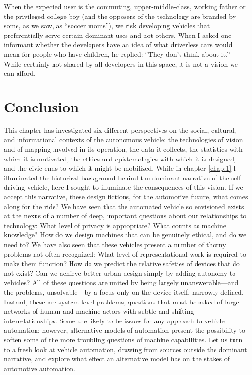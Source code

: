 When the
expected user is the commuting, upper-middle-class, working father or
the privileged college boy (and the opposers of the technology are
branded by some, as we saw, as ``soccer moms''), we risk developing
vehicles that preferentially serve certain dominant uses and not
others. When I asked one informant whether the developers have an idea
of what driverless cars would mean for people who have children, he
replied:  ``They don't think about it.'' While certainly not shared by
all developers in this space, it is not a vision we can afford.

\section{Conclusion}

This chapter has investigated six different perspectives on the
social, cultural, and informational contexts of the autonomous
vehicle:  the technologies of vision and of mapping involved
in its operation, the 
data it collects, the statistics with which it is motivated, the
ethics and epistemologies with which it is designed, and the civic
ends to which it might be mobilized. While in chapter \ref{chap:1} I
illuminated the historical background behind the dominant narrative of
the self-driving vehicle, here I sought to illuminate the
consequences of this vision. If we accept this narrative, these design
fictions, for the automotive future, what comes along for the ride? We
have seen that the automated vehicle so envisioned exists at the
nexus of a number of deep, important questions about our relationships
to technology: What level of privacy is appropriate? What counts as machine
knowledge? How do we design machines that can be genuinely ethical,
and do we need to? We have also seen that these vehicles present a
number of thorny problems not often recognized: What level of
representational work is required to make them function? How do we
predict the relative safeties of devices that do not exist? Can we
achieve better urban design simply by adding autonomy to vehicles?
All of these questions are united by being largely unanswerable---and
the problems, unsolvable---by a focus only on the device itself,
narrowly defined. Instead, these are system-level problems, questions
that must be asked of large networks of human and machine actors with
subtle and shifting interrelationships. Some are likely to be issues
for any approach to vehicle automation; however, alternative models of
automation present the possibility to soften some of the more
troubling questions of machine capabilities. Let us turn to a fresh look at
vehicle automation, drawing from sources outside the dominant
narrative, and explore what effect an alternative model has on the
stakes of automotive automation.

